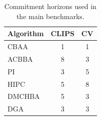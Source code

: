 \begin{table}[t]
    \centering
    \caption{Commitment horizons used in the main benchmarks.}
    \label{tab:default_horizons}
    \begin{tabular}{lcc}
        \hline
        Algorithm & CLIPS & CV \\
        \hline
        CBAA & 1 & 1 \\
        ACBBA & 8 & 3 \\
        PI & 3 & 5 \\
        HIPC & 5 & 8 \\
        DMCHBA & 5 & 3 \\
        DGA & 3 & 3 \\
        \hline
    \end{tabular}
\end{table}
